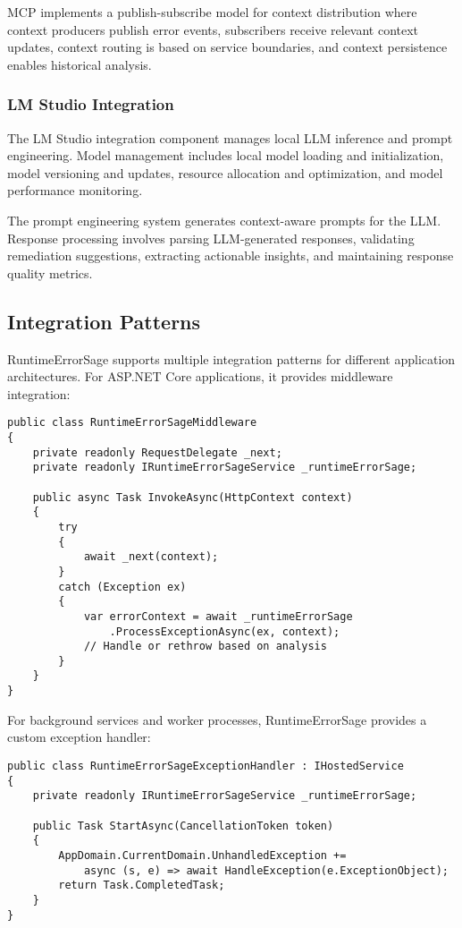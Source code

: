 MCP implements a publish-subscribe model for context distribution where context producers publish error events, subscribers receive relevant context updates, context routing is based on service boundaries, and context persistence enables historical analysis.

\subsubsection{LM Studio Integration}
The LM Studio integration component manages local LLM inference and prompt engineering. Model management includes local model loading and initialization, model versioning and updates, resource allocation and optimization, and model performance monitoring.

The prompt engineering system generates context-aware prompts for the LLM. Response processing involves parsing LLM-generated responses, validating remediation suggestions, extracting actionable insights, and maintaining response quality metrics.

\subsection{Integration Patterns}
RuntimeErrorSage supports multiple integration patterns for different application architectures. For ASP.NET Core applications, it provides middleware integration:

\begin{lstlisting}[style=csharpstyle,caption={ASP.NET Core Middleware Integration},label=lst:middleware-architecture]
public class RuntimeErrorSageMiddleware
{
    private readonly RequestDelegate _next;
    private readonly IRuntimeErrorSageService _runtimeErrorSage;

    public async Task InvokeAsync(HttpContext context)
    {
        try
        {
            await _next(context);
        }
        catch (Exception ex)
        {
            var errorContext = await _runtimeErrorSage
                .ProcessExceptionAsync(ex, context);
            // Handle or rethrow based on analysis
        }
    }
}
\end{lstlisting}

For background services and worker processes, RuntimeErrorSage provides a custom exception handler:

\begin{lstlisting}[style=csharpstyle,caption={Background Service Integration},label=lst:background]
public class RuntimeErrorSageExceptionHandler : IHostedService
{
    private readonly IRuntimeErrorSageService _runtimeErrorSage;
    
    public Task StartAsync(CancellationToken token)
    {
        AppDomain.CurrentDomain.UnhandledException += 
            async (s, e) => await HandleException(e.ExceptionObject);
        return Task.CompletedTask;
    }
}
\end{lstlisting}

